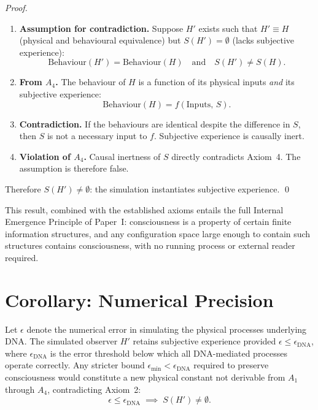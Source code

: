 \documentclass[11pt]{article}
\begin{document}
\begin{proof}
\begin{enumerate}
\item \textbf{Assumption for contradiction.} Suppose $H'$ exists such that
$H' \equiv H$ (physical and behavioural equivalence) but $S(H') = \emptyset$
(lacks subjective experience):
\[
\mathrm{Behaviour}(H') = \mathrm{Behaviour}(H)
\quad \text{and} \quad
S(H') \neq S(H).
\]

\item \textbf{From $A_4$.} The behaviour of $H$ is a function of its
physical inputs \emph{and} its subjective experience:
\[
\mathrm{Behaviour}(H) = f(\mathrm{Inputs},\, S).
\]

\item \textbf{Contradiction.} If the behaviours are identical despite the
difference in $S$, then $S$ is not a necessary input to $f$. Subjective
experience is causally inert.

\item \textbf{Violation of $A_4$.} Causal inertness of $S$ directly
contradicts Axiom~4. The assumption is therefore false.
\end{enumerate}

Therefore $S(H') \neq \emptyset$: the simulation instantiates subjective
experience. \qed
\end{proof}

This result, combined with the established axioms entails the full Internal Emergence Principle
of Paper~I: consciousness is a property of certain finite information
structures, and any configuration space large enough to contain such
structures contains consciousness, with no running process or external
reader required.

\section{Corollary: Numerical Precision}
\label{sec:corollary}

\begin{corollary}
Let $\epsilon$ denote the numerical error in simulating the physical
processes underlying DNA. The simulated observer $H'$ retains subjective
experience provided $\epsilon \leq \epsilon_{\mathrm{DNA}}$, where
$\epsilon_{\mathrm{DNA}}$ is the error threshold below which all
DNA-mediated processes operate correctly. Any stricter bound
$\epsilon_{\min} < \epsilon_{\mathrm{DNA}}$ required to preserve
consciousness would constitute a new physical constant not derivable from
$A_1$ through $A_4$, contradicting Axiom~2:
\[
\epsilon \leq \epsilon_{\mathrm{DNA}}
\;\implies\; S(H') \neq \emptyset.
\]
\end{corollary}
\end{document}
